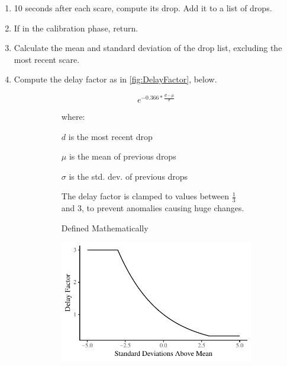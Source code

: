 \documentclass[12pt,a4paper]{article}\usepackage[]{graphicx}\usepackage[]{color}
\makeatletter
\def\maxwidth{ %
  \ifdim\Gin@nat@width>\linewidth
    \linewidth
  \else
    \Gin@nat@width
  \fi
}
\makeatother
\begin{document}
\begin{enumerate}
	\item 10 seconds after each scare, compute its drop.
	Add it to a list of drops.
	\item If in the calibration phase, return.
	\item Calculate the mean and standard deviation of the drop list, excluding the most recent scare.
	\item Compute the delay factor as in \cref{fig:DelayFactor}, below.
	
	\begin{figure}[H]
  \centering
    \begin{subfigure}[t]{.45\linewidth}
  	\begin{minipage}{\textwidth}
  		\begin{equation}
  		e^{-0.366 * \frac{d - \mu}{\sigma}}
  		\end{equation}
  		
  		where:
  		
  		$d$ is the most recent drop
  		
  		$\mu$ is the mean of previous drops
  		
  		$\sigma$ is the std. dev. of previous drops
  		
  		The delay factor is clamped to values between $\frac{1}{3}$ and $3$, to prevent anomalies causing huge changes.
  	\end{minipage}
  	\caption{Defined Mathematically}
  \end{subfigure}
  \begin{subfigure}[t]{.45\linewidth}
  	\begin{minipage}{\textwidth}


{\centering \includegraphics[width=\maxwidth]{figure/DelayFactor-1} 

}
\end{minipage}
\end{subfigure}
\end{figure}
\end{enumerate}
\end{document}

